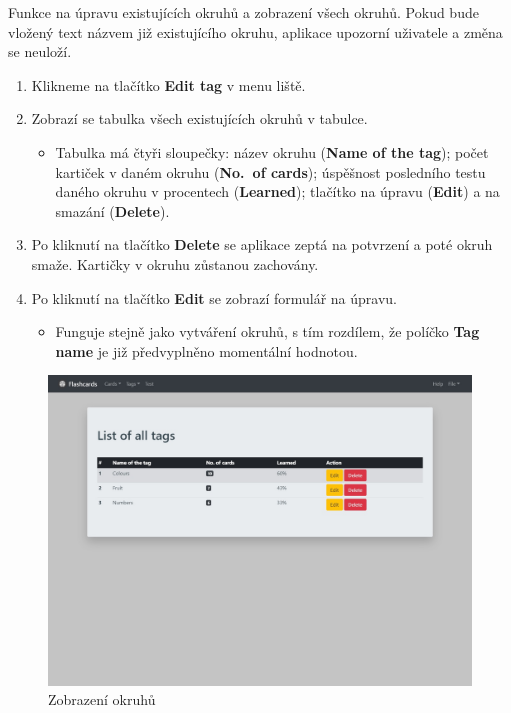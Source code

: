 \documentclass[11pt]{article}
\providecommand{\tightlist}{\setlength{\itemsep}{1pt}\setlength{\parskip}{1pt}}
\begin{document}
Funkce na úpravu existujících okruhů a zobrazení všech okruhů. Pokud
bude vložený text názvem již existujícího okruhu, aplikace upozorní
uživatele a změna se neuloží.

\begin{enumerate}
\def\labelenumi{\arabic{enumi}.}
\tightlist
\item
  Klikneme na tlačítko \textbf{Edit tag} v menu liště.
\item
  Zobrazí se tabulka všech existujících okruhů v tabulce.

  \begin{itemize}
  \tightlist
  \item
    Tabulka má čtyři sloupečky: název okruhu (\textbf{Name of the tag});
    počet kartiček v daném okruhu (\textbf{No.~of cards}); úspěšnost
    posledního testu daného okruhu v procentech (\textbf{Learned});
    tlačítko na úpravu (\textbf{Edit}) a na smazání (\textbf{Delete}).
  \end{itemize}
\item
  Po kliknutí na tlačítko \textbf{Delete} se aplikace zeptá na potvrzení
  a poté okruh smaže. Kartičky v okruhu zůstanou zachovány.
\item
  Po kliknutí na tlačítko \textbf{Edit} se zobrazí formulář na úpravu.

  \begin{itemize}
  \tightlist
  \item
    Funguje stejně jako vytváření okruhů, s tím rozdílem, že políčko
    \textbf{Tag name} je již předvyplněno momentální hodnotou.
  \end{itemize}
\end{enumerate}

\begin{figure}
\centering
\includegraphics{../../../../assets/list_tag.jpg}
\caption{Zobrazení okruhů}
\end{figure}
\end{document}
